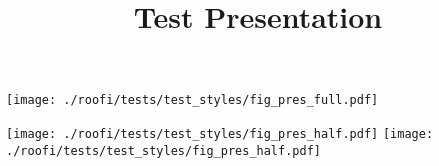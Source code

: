\documentclass[xcolor=dvipsnames]{beamer}
\title{Test Presentation}
\begin{document}
\frame[plain]{\titlepage}

\begin{frame}[plain]
  \texttt{[image: ./roofi/tests/test\_styles/fig\_pres\_full.pdf]}
\end{frame}
%   

\begin{frame}
  \texttt{[image: ./roofi/tests/test\_styles/fig\_pres\_half.pdf]}
  \texttt{[image: ./roofi/tests/test\_styles/fig\_pres\_half.pdf]}
\end{frame}
\end{document}
